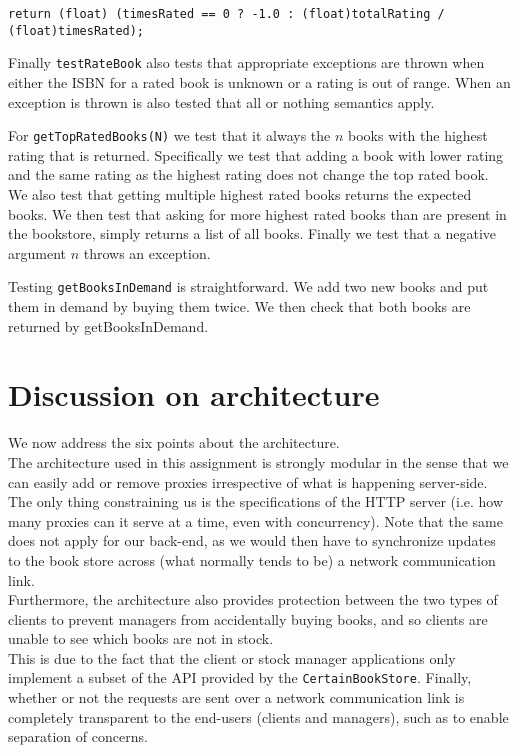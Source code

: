 \documentclass[11pt]{article}
\begin{document}
\begin{center}
\texttt{return (float) (timesRated == 0 ? -1.0 : (float)totalRating / (float)timesRated);}
\end{center}

Finally \texttt{testRateBook} also tests that appropriate exceptions are thrown when either the ISBN for a rated book is unknown or a rating is out of range. When an exception is thrown is also tested that all or nothing semantics apply.

For \texttt{getTopRatedBooks(N)} we test that it always the $n$ books with the highest rating that is returned. Specifically we test that adding a book with lower rating and the same rating as the highest rating does not change the top rated book. We also test that getting multiple highest rated books returns the expected books. We then test that asking for more highest rated books than are present in the bookstore, simply returns a list of all books. Finally we test that a negative argument $n$ throws an exception.

Testing \texttt{getBooksInDemand} is straightforward. We add two new books and put them in demand by buying them twice. We then check that both books are returned by getBooksInDemand.

\section*{Discussion on architecture}

We now address the six points about the architecture.\\
The architecture used in this assignment is strongly modular in the sense that
we can easily add or remove proxies irrespective of what is happening
server-side. The only thing constraining us is the specifications of the HTTP
server (i.e. how many proxies can it serve at a time, even with
concurrency). Note that the same does not apply for our back-end, as we would
then have to synchronize updates to the book store across (what normally
tends to be) a network communication link.\\

Furthermore, the architecture also provides protection between the two types of
clients to prevent managers from accidentally buying books, and so clients are
unable to see which books are not in stock.\\

This is due to the fact that the client or stock manager applications only 
implement a subset of the API provided by the \texttt{CertainBookStore}.
Finally, whether or not the requests are sent over a network communication link
is completely transparent to the end-users (clients and managers), such as to
enable separation of concerns.\\
\end{document}

